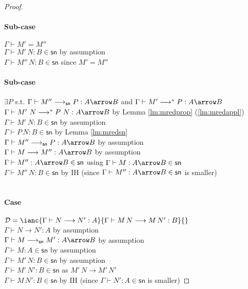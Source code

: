\documentclass{article}
\newcommand{\csn}{\mathsf{sn}}
\newcommand{\mred}{\longrightarrow^*}
\newcommand{\red}{\longrightarrow}
\newcommand{\redsn}{\longrightarrow_\csn}
\begin{document}
\begin{proof}
\paragraph{Sub-case} $\Gamma \vdash M' = M''$
\\[1em]
$\Gamma \vdash M'\,N : B \in \csn$ \hfill by assumption \\
$\Gamma \vdash M''\,N : B \in \csn$ \hfill since $M' = M''$

\paragraph{Sub-case} $\exists P$ s.t. $\Gamma \vdash M'' \redsn P : A \arrow B$ and $\Gamma \vdash M' \mred P: A \arrow B$
\\[1em]
$\Gamma \vdash M'~N \mred P~N : A \arrow B$ \hfill by Lemma \ref{lm:mredprop} (\ref{lm:mredappl}) \\
$\Gamma \vdash M'~N : B \in \csn$ \hfill by assumption \\
$\Gamma \vdash P\,N : B \in \csn$ \hfill by Lemma \ref{lm:mredsn} \\
$\Gamma \vdash M'' \redsn P : A \arrow B$ \hfill by assumption \\
$\Gamma \vdash M \red M'' : A \arrow B$ \hfill by assumption \\
$\Gamma \vdash M'' : A \arrow B \in \csn$ \hfill using $\Gamma \vdash M : A \arrow B \in \csn$ \\
$\Gamma \vdash M''\,N : B \in \csn$ \hfill by IH (since $\Gamma \vdash M'': A \arrow B \in \csn$ is smaller) \\
\\[0.5em]

\paragraph{Case} $\mathcal{D} = \ianc{\Gamma \vdash N \red N' : A}{\Gamma \vdash M\,N \red M\,N': B}{}$
\\[1em]
$\Gamma \vdash N \red N' : A $ \hfill by assumption \\
$\Gamma \vdash M \redsn M' : A \arrow B$ \hfill by assumption \\
$\Gamma \vdash M: A \in \csn$ \hfill  by assumption\\
$\Gamma \vdash M'\,N : B \in \csn$ \hfill by assumption\\
$\Gamma \vdash M'\,N': B \in \csn$ \hfill as $M'\,N \red M'\,N'$\\
$\Gamma \vdash M\,N' : B \in \csn$ \hfill by IH (since $\Gamma \vdash N': A \in \csn$ is smaller)

\end{proof}
\end{document}
